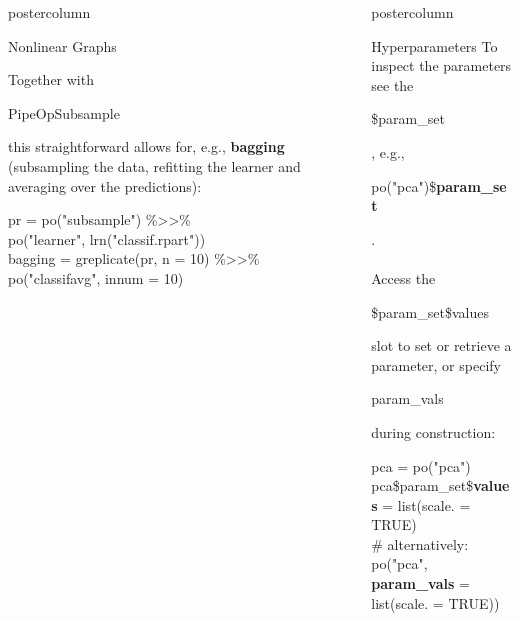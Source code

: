 \documentclass{beamer}
\newlength{\columnheight} %
\newcommand{\codeinline}[1]{\begin{codeboxinline}#1\end{codeboxinline}}
\begin{document}
\begin{frame}[fragile]{}
\begin{columns}
\begin{column}{.245\textwidth}
\begin{beamercolorbox}[center]{postercolumn}
\begin{minipage}{.98\textwidth}
{\begin{myblock}{Nonlinear Graphs}
\begin{center}
              \end{center}
              Together with \codeinline{PipeOpSubsample} this straightforward allows for, e.g., \textbf{bagging} (subsampling the data, refitting the learner and averaging over the predictions):
              \begin{codeboxexample}
						    {\footnotesize
                  pr = po("subsample") \%>{}>\%\\
                  \hspace*{1ex} po("learner", lrn("classif.rpart"))\\
                  bagging = greplicate(pr, n = 10) \%>{}>\%\\
                  \hspace*{1ex} po("classifavg", innum = 10)}
					    \end{codeboxexample}
            \end{myblock}
						\vfill}
				\end{minipage}
			\end{beamercolorbox}
		\end{column}
    \begin{column}{.245\textwidth}
			\begin{beamercolorbox}[center]{postercolumn}
				\begin{minipage}{.98\textwidth}
					\parbox[t][\columnheight]{\textwidth}{
            \begin{myblock}{Hyperparameters}
              To inspect the parameters see the \codeinline{\$param\_set}, e.g., \codeinline{po("pca")\$\textbf{param\_set}}.\\
              \ \\
              Access the \codeinline{\$param\_set\$values} slot to set or retrieve a parameter, or specify \codeinline{param\_vals} during construction:
              \begin{codeboxmultiline}[width=24cm]
                {\footnotesize pca = po("pca") \\
                pca\$param\_set\$\textbf{values} = list(scale. = TRUE) \\
                \# alternatively:\\
                po("pca", \textbf{param\_vals} = list(scale. = TRUE))}
              \end{codeboxmultiline}
              \ \\

\end{myblock}}
\end{minipage}
\end{beamercolorbox}
\end{column}
\end{columns}
\end{frame}
\end{document}
